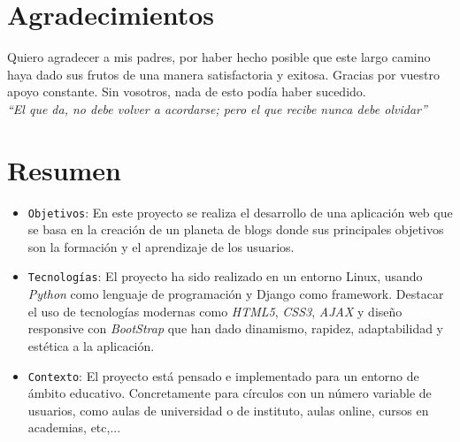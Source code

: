 \documentclass[a4paper, 12pt]{book}
\begin{document}
\newpage
\mbox{}
\thispagestyle{empty} %





\chapter*{Agradecimientos}
Quiero agradecer a mis padres, por haber hecho posible que este largo camino haya dado sus frutos de una manera satisfactoria y exitosa. 
Gracias por vuestro apoyo constante. Sin vosotros, nada de esto pod\'ia haber sucedido.\\

\textit{``El que da, no debe volver a acordarse; pero el que recibe nunca debe olvidar''}\\


\chapter*{Resumen}
\begin{itemize}
  \item \texttt{Objetivos}: En este proyecto se realiza el desarrollo de una aplicaci\'on web que se basa en la creaci\'on de un planeta de 
  blogs donde sus principales objetivos son la formaci\'on y el aprendizaje de los usuarios.

  \item \texttt{Tecnolog\'ias}: El proyecto ha sido realizado en un entorno Linux, usando \textit{Python} como lenguaje de programaci\'on y Django como 
  framework. Destacar el uso de tecnolog\'ias modernas como \textit{HTML5}, \textit{CSS3}, \textit{AJAX} y dise\~no responsive con \textit{BootStrap} que han dado dinamismo, rapidez, adaptabilidad y 
  est\'etica a la aplicaci\'on.

  \item \texttt{Contexto}: El proyecto est\'a pensado e implementado para un entorno de \'ambito educativo. Concretamente para c\'irculos con un n\'umero variable de 
  usuarios, como aulas de universidad o de instituto, aulas online, cursos en academias, etc,...
\end{itemize}
\end{document}
